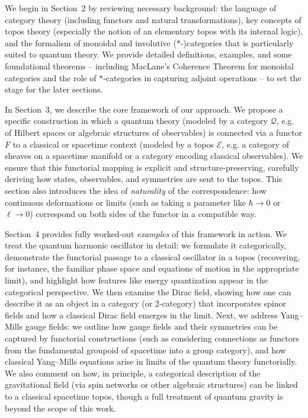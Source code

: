 \vspace{0.5cm}

We begin in Section~2 by reviewing necessary background: the language of category theory (including functors and natural transformations), key concepts of topos theory (especially the notion of an elementary topos with its internal logic), and the formalism of monoidal and involutive ($*$-)categories that is particularly suited to quantum theory. We provide detailed definitions, examples, and some foundational theorems -- including MacLane's Coherence Theorem for monoidal categories and the role of $*$-categories in capturing adjoint operations -- to set the stage for the later sections.

\vspace{0.5cm}

In Section~3, we describe the core framework of our approach. We propose a specific construction in which a quantum theory (modeled by a category $\mathcal{Q}$, e.g. of Hilbert spaces or algebraic structures of observables) is connected via a functor $F$ to a classical or spacetime context (modeled by a topos $\mathcal{E}$, e.g. a category of sheaves on a spacetime manifold or a category encoding classical observables). We ensure that this functorial mapping is explicit and structure-preserving, carefully deriving how states, observables, and symmetries are sent to the topos. This section also introduces the idea of \emph{naturality} of the correspondence: how continuous deformations or limits (such as taking a parameter like $\hbar \to 0$ or $\ell \to 0$) correspond on both sides of the functor in a compatible way.

\vspace{0.5cm}

Section~4 provides fully worked-out \emph{examples} of this framework in action. We treat the quantum harmonic oscillator in detail: we formulate it categorically, demonstrate the functorial passage to a classical oscillator in a topos (recovering, for instance, the familiar phase space and equations of motion in the appropriate limit), and highlight how features like energy quantization appear in the categorical perspective. We then examine the Dirac field, showing how one can describe it as an object in a category (or 2-category) that incorporates spinor fields and how a classical Dirac field emerges in the limit. Next, we address Yang--Mills gauge fields: we outline how gauge fields and their symmetries can be captured by functorial constructions (such as considering connections as functors from the fundamental groupoid of spacetime into a group category), and how classical Yang--Mills equations arise in limits of the quantum theory functorially. We also comment on how, in principle, a categorical description of the gravitational field (via spin networks or other algebraic structures) can be linked to a classical spacetime topos, though a full treatment of quantum gravity is beyond the scope of this work.

